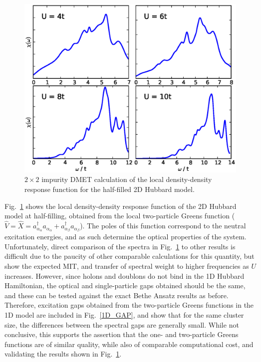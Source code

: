 \documentclass[aps,twocolumn,nobibnotes]{revtex4}
\begin{document}
\begin{figure}
\begin{center}
    \vspace{-2mm}
\includegraphics[scale=0.425]{Plots/2D_DD/2D_DD_Spectra.eps}
\end{center}
    \vspace{-8mm}
\caption{$2 \times 2$ impurity DMET calculation of the local density-density response function for the half-filled 2D Hubbard model.}
\label{2D_DD}
\end{figure}


Fig.~\ref{2D_DD} shows the local density-density response function of the 2D Hubbard model at half-filling, obtained from the local two-particle Greens 
function (${\hat V}={\hat X}=a_{\alpha_{\alpha}}^{\dagger}a_{\alpha_{\alpha}} + a_{\alpha_{\beta}}^{\dagger}a_{\alpha_{\beta}}$). The poles of this 
function correspond to the neutral excitation energies, and as such determine 
the optical properties of the system\cite{Millis2012,Essler91}.
Unfortunately, direct comparison of the spectra in Fig.~\ref{2D_DD} to other results is difficult due to the paucity of other comparable 
calculations for this quantity, but show the expected MIT, and transfer of spectral weight to higher frequencies as $U$ increases.
However, since holons and doublons do not bind in the 1D Hubbard Hamiltonian, 
the optical and single-particle gaps obtained should be the same, and these can be tested against the exact Bethe Ansatz results as before\cite{Essler91}. Therefore, excitation gaps
obtained from the two-particle Greens functions in the 1D model are included in Fig.~\ref{1D_GAP}, and show that for the same cluster size, the differences between the spectral gaps are generally small.
While not conclusive, this supports the assertion that the one- and two-particle Greens functions are of similar quality, while also of comparable computational cost, and validating the results shown in Fig.~\ref{2D_DD}.
\end{document}
